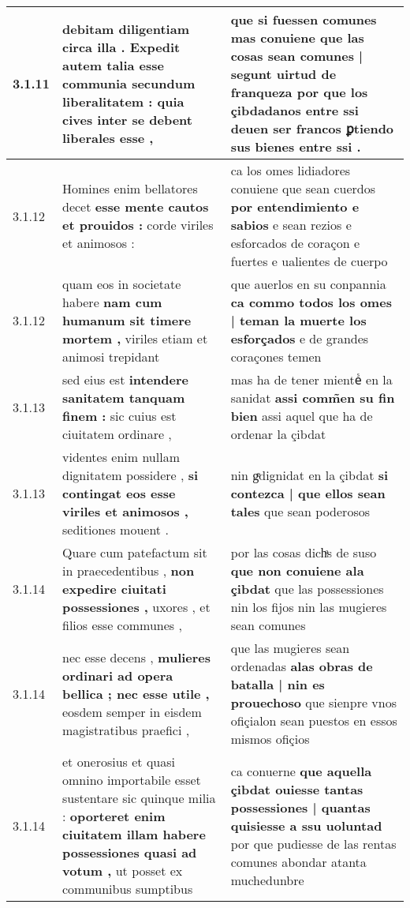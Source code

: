 \begin{tabular}{|p{1cm}|p{6.5cm}|p{6.5cm}|}
3.1.11 & debitam diligentiam circa illa . \textbf{ Expedit autem talia esse communia secundum liberalitatem : } quia cives inter se debent liberales esse , & que si fuessen comunes \textbf{ mas conuiene que las cosas sean comunes | segunt uirtud de franqueza } por que los çibdadanos entre ssi deuen ser francos ꝑtiendo sus bienes entre ssi . \\\hline
3.1.12 & Homines enim bellatores decet \textbf{ esse mente cautos et prouidos : } corde viriles et animosos : & ca los omes lidiadores conuiene que sean cuerdos \textbf{ por entendimiento e sabios } e sean rezios e esforcados de coraçon e fuertes e ualientes de cuerpo \\\hline
3.1.12 & quam eos in societate habere \textbf{ nam cum humanum sit timere mortem , } viriles etiam et animosi trepidant & que auerlos en su conpannia \textbf{ ca commo todos los omes | teman la muerte los esforçados } e de grandes coraçones temen \\\hline
3.1.13 & sed eius est \textbf{ intendere sanitatem tanquam finem : } sic cuius est ciuitatem ordinare , & mas ha de tener mienteᷤ en la sanidat \textbf{ assi comm̃en su fin bien } assi aquel que ha de ordenar la çibdat \\\hline
3.1.13 & videntes enim nullam dignitatem possidere , \textbf{ si contingat eos esse viriles et animosos , } seditiones mouent . & nin gͤdignidat en la çibdat \textbf{ si contezca | que ellos sean tales } que sean poderosos \\\hline
3.1.14 & Quare cum patefactum sit in praecedentibus , \textbf{ non expedire ciuitati possessiones , } uxores , et filios esse communes , & por las cosas dichͣs de suso \textbf{ que non conuiene ala çibdat } que las possessiones nin los fijos nin las mugieres sean comunes \\\hline
3.1.14 & nec esse decens , \textbf{ mulieres ordinari ad opera bellica ; nec esse utile , } eosdem semper in eisdem magistratibus praefici , & que las mugieres sean ordenadas \textbf{ alas obras de batalla | nin es prouechoso } que sienpre vnos ofiçialon sean puestos en essos mismos ofiçios \\\hline
3.1.14 & et onerosius et quasi omnino importabile esset sustentare sic quinque milia : \textbf{ oporteret enim ciuitatem illam habere possessiones quasi ad votum , } ut posset ex communibus sumptibus & ca conuerne \textbf{ que aquella çibdat ouiesse tantas possessiones | quantas quisiesse a ssu uoluntad } por que pudiesse de las rentas comunes abondar atanta muchedunbre \\\hline

\end{tabular}
